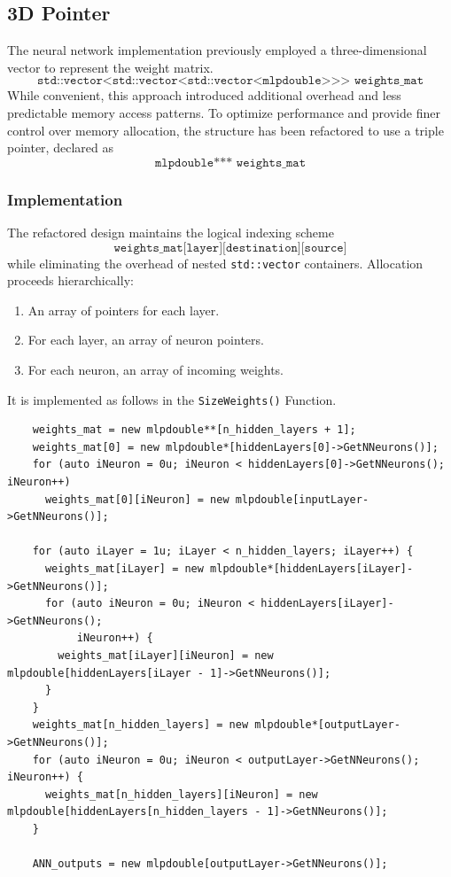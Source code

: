 \documentclass{article}
\begin{document}
\subsection{3D Pointer}
\label{subsec:3D}
The neural network implementation previously employed a three-dimensional vector to represent the weight matrix.
\[
\texttt{std::vector<std::vector<std::vector<mlpdouble>>> weights\_mat}
\]
While convenient, this approach introduced additional overhead and less predictable memory access patterns. To optimize performance and provide finer control over memory allocation, the structure has been refactored to use a triple pointer, declared as
\[
\texttt{mlpdouble*** weights\_mat}
\]

\subsubsection{Implementation}
The refactored design maintains the logical indexing scheme 
\[
\texttt{weights\_mat[layer][destination][source]}
\]
while eliminating the overhead of nested \texttt{std::vector} containers. Allocation proceeds hierarchically:
\begin{enumerate}
  \item An array of pointers for each layer.
  \item For each layer, an array of neuron pointers.
  \item For each neuron, an array of incoming weights.
\end{enumerate}
It is implemented as follows in the \texttt{SizeWeights()} Function.
\begin{verbatim}
    weights_mat = new mlpdouble**[n_hidden_layers + 1];
    weights_mat[0] = new mlpdouble*[hiddenLayers[0]->GetNNeurons()];
    for (auto iNeuron = 0u; iNeuron < hiddenLayers[0]->GetNNeurons(); iNeuron++)
      weights_mat[0][iNeuron] = new mlpdouble[inputLayer->GetNNeurons()];

    for (auto iLayer = 1u; iLayer < n_hidden_layers; iLayer++) {
      weights_mat[iLayer] = new mlpdouble*[hiddenLayers[iLayer]->GetNNeurons()];
      for (auto iNeuron = 0u; iNeuron < hiddenLayers[iLayer]->GetNNeurons();
           iNeuron++) {
        weights_mat[iLayer][iNeuron] = new mlpdouble[hiddenLayers[iLayer - 1]->GetNNeurons()];
      }
    }
    weights_mat[n_hidden_layers] = new mlpdouble*[outputLayer->GetNNeurons()];
    for (auto iNeuron = 0u; iNeuron < outputLayer->GetNNeurons(); iNeuron++) {
      weights_mat[n_hidden_layers][iNeuron] = new mlpdouble[hiddenLayers[n_hidden_layers - 1]->GetNNeurons()];
    }

    ANN_outputs = new mlpdouble[outputLayer->GetNNeurons()];
\end{verbatim}
\end{document}

